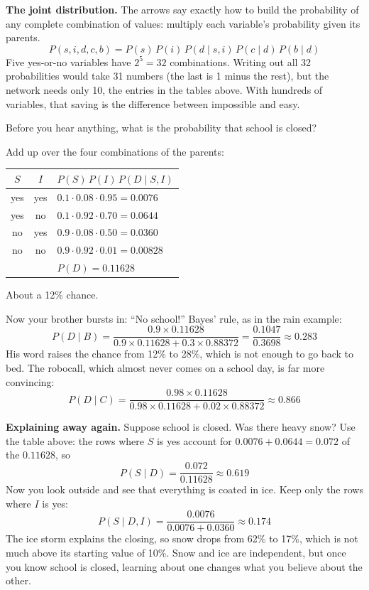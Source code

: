\textbf{The joint distribution.} The arrows say exactly how to build the probability of any complete
combination of values: multiply each variable's probability given its parents.
$$P(s, i, d, c, b) = P(s)\,P(i)\,P(d \mid s, i)\,P(c \mid d)\,P(b \mid d)$$
Five yes-or-no variables have $2^5 = 32$ combinations. Writing out all 32 probabilities would take 31 numbers
(the last is 1 minus the rest), but the network needs only 10, the entries in the tables above. With hundreds of
variables, that saving is the difference between impossible and easy.

\begin{Worked}
\begin{Problem}
Before you hear anything, what is the probability that school is closed?
\end{Problem}
\begin{Solution}
Add up over the four combinations of the parents:

\begin{center}
\begin{tabular}{c c l}
$S$ & $I$ & $P(S)\,P(I)\,P(D \mid S, I)$ \\
\hline
yes & yes & $0.1 \cdot 0.08 \cdot 0.95 = 0.0076$ \\
yes & no & $0.1 \cdot 0.92 \cdot 0.70 = 0.0644$ \\
no & yes & $0.9 \cdot 0.08 \cdot 0.50 = 0.0360$ \\
no & no & $0.9 \cdot 0.92 \cdot 0.01 = 0.00828$ \\
\hline
 & & $P(D) = 0.11628$ \\
\end{tabular}
\end{center}

About a 12\% chance.
\end{Solution}
\end{Worked}

Now your brother bursts in: ``No school!'' Bayes' rule, as in the rain example:
$$P(D \mid B) = \frac{0.9 \times 0.11628}{0.9 \times 0.11628 + 0.3 \times 0.88372} = \frac{0.1047}{0.3698} \approx 0.283$$
His word raises the chance from 12\% to 28\%, which is not enough to go back to bed. The robocall, which almost
never comes on a school day, is far more convincing:
$$P(D \mid C) = \frac{0.98 \times 0.11628}{0.98 \times 0.11628 + 0.02 \times 0.88372} \approx 0.866$$

\textbf{Explaining away again.} Suppose school is closed. Was there heavy snow? Use the table above: the rows
where $S$ is yes account for $0.0076 + 0.0644 = 0.072$ of the $0.11628$, so
$$P(S \mid D) = \frac{0.072}{0.11628} \approx 0.619$$
Now you look outside and see that everything is coated in ice. Keep only the rows where $I$ is yes:
$$P(S \mid D, I) = \frac{0.0076}{0.0076 + 0.0360} \approx 0.174$$
The ice storm explains the closing, so snow drops from 62\% to 17\%, which is not much above its starting value
of 10\%. Snow and ice are independent, but once you know school is closed, learning about one changes what you
believe about the other.

